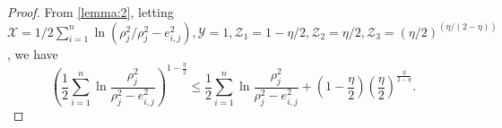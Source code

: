 \documentclass[pdflatex,sn-mathphys-num]{sn-jnl}%
\theoremstyle{thmstyleone}%
\theoremstyle{thmstyletwo}%
\theoremstyle{thmstylethree}%
\begin{document}
\begin{proof}


			
From \cref{lemma:2}, letting $\mathcal{X} =1/2\sum_{i=1}^{n} \ln({\rho_{j}^2}/{\rho_{j}^2-e_{i,j}^2}), \mathcal{Y} =1, \mathcal{Z}_{1}= {1-{\eta}/{2}}, \mathcal{Z}_{2}={\eta}/{2}, \mathcal{Z}_{3}= (\eta/2)^{(\eta/(2-\eta))}$, we have
\begin{equation}\label{eq:59}
	\left(\frac{1}{2}\sum_{i=1}^{n} \ln\frac{\rho_{j}^2}{\rho_{j}^2-e_{i,j}^2}\right)^{1-\frac{\eta}{2}} \le \frac{1}{2} \sum_{i=1}^{n} \ln\frac{\rho_{j}^2}{\rho_{j}^2-e_{i,j}^2}+\left( 1-\frac{\eta}{2}\right) \left(\frac{\eta}{2}\right)^{\frac{\eta}{2-\eta}}.
\end{equation}


\end{proof}
\end{document}
